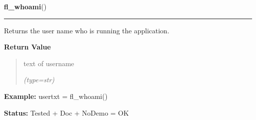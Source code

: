     \label{xformslib:flbasic:fl_whoami}

    \vspace{0.5ex}

\hspace{.8\funcindent}\begin{boxedminipage}{\funcwidth}

    \raggedright \textbf{fl\_whoami}()

    \vspace{-1.5ex}

    \rule{\textwidth}{0.5\fboxrule}
\setlength{\parskip}{2ex}
    Returns the user name who is running the application.

\setlength{\parskip}{1ex}
      \textbf{Return Value}
    \vspace{-1ex}

      \begin{quote}
      text of username

      {\it (type=str)}

      \end{quote}

\textbf{Example:} usertxt = fl\_whoami()



\textbf{Status:} Tested + Doc + NoDemo = OK



    \end{boxedminipage}

    \label{xformslib:flbasic:fl_mouse_button}

    \vspace{0.5ex}

